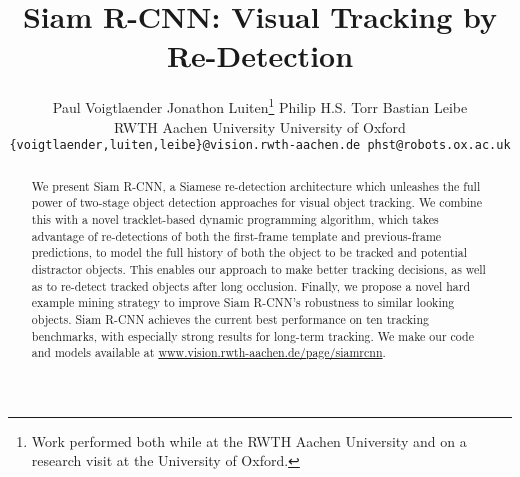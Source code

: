 \documentclass[10pt,twocolumn,letterpaper]{article}
\begin{document}
\title{\vspace{-4pt}Siam R-CNN: Visual Tracking by Re-Detection\vspace{-4pt}}



\addtocounter{footnote}{1}
\author{Paul Voigtlaender \hspace{20pt} Jonathon Luiten\thanks{Work performed both while at the RWTH Aachen University and on a research visit at the University of Oxford.}  \hspace{20pt} Philip H.S. Torr \hspace{20pt} Bastian Leibe\\
RWTH Aachen University \hspace{20pt} University of Oxford\\
{\tt\small \{voigtlaender,luiten,leibe\}@vision.rwth-aachen.de \hspace{20pt} phst@robots.ox.ac.uk} \vspace{0pt}
}



\maketitle

\thispagestyle{empty}

\begin{abstract}
\vspace{-4pt}

We present Siam R-CNN, a Siamese re-detection architecture which unleashes the full power of two-stage object detection approaches for visual object tracking. We combine this with a novel tracklet-based dynamic programming algorithm, which takes advantage of re-detections of both the first-frame template and previous-frame predictions, to model the full history of both the object to be tracked and potential distractor objects.
This enables our approach to make better tracking decisions, as well as to re-detect tracked objects after long occlusion.
Finally, we propose a novel hard example mining strategy to improve Siam R-CNN's robustness to similar looking objects. Siam R-CNN achieves the current best performance on ten tracking benchmarks, with especially strong results for long-term tracking. We make our code and models available at \url{www.vision.rwth-aachen.de/page/siamrcnn}.
\vspace{-4pt}





\end{abstract}
\end{document}

